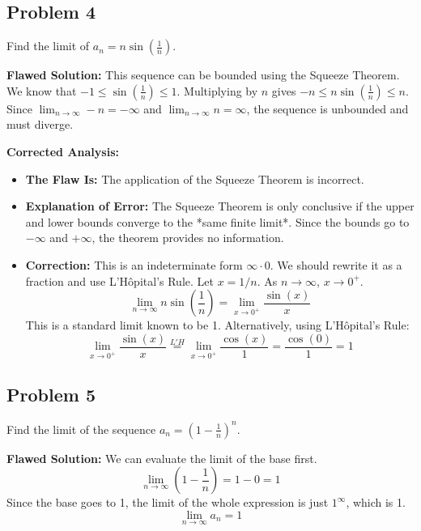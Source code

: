 \documentclass{article}
\begin{document}
\subsection{Problem 4}
Find the limit of $a_n = n \sin(\frac{1}{n})$.

\textbf{Flawed Solution:}
This sequence can be bounded using the Squeeze Theorem. We know that $-1 \le \sin(\frac{1}{n}) \le 1$.
Multiplying by $n$ gives $-n \le n\sin(\frac{1}{n}) \le n$.
Since $\lim_{n \to \infty} -n = -\infty$ and $\lim_{n \to \infty} n = \infty$, the sequence is unbounded and must diverge.

\textbf{Corrected Analysis:}
\begin{itemize}
    \item \textbf{The Flaw Is:} The application of the Squeeze Theorem is incorrect.
    \item \textbf{Explanation of Error:} The Squeeze Theorem is only conclusive if the upper and lower bounds converge to the *same finite limit*. Since the bounds go to $-\infty$ and $+\infty$, the theorem provides no information.
    \item \textbf{Correction:} This is an indeterminate form $ \infty \cdot 0 $. We should rewrite it as a fraction and use L'Hôpital's Rule. Let $x = 1/n$. As $n \to \infty$, $x \to 0^+$.
    \[ \lim_{n \to \infty} n \sin\left(\frac{1}{n}\right) = \lim_{x \to 0^+} \frac{\sin(x)}{x} \]
    This is a standard limit known to be 1. Alternatively, using L'Hôpital's Rule:
    \[ \lim_{x \to 0^+} \frac{\sin(x)}{x} \overset{L'H}{=} \lim_{x \to 0^+} \frac{\cos(x)}{1} = \frac{\cos(0)}{1} = 1 \]
\end{itemize}

\subsection{Problem 5}
Find the limit of the sequence $a_n = \left(1 - \frac{1}{n}\right)^n$.

\textbf{Flawed Solution:}
We can evaluate the limit of the base first.
\[ \lim_{n \to \infty} \left(1 - \frac{1}{n}\right) = 1 - 0 = 1 \]
Since the base goes to 1, the limit of the whole expression is just $1^\infty$, which is 1.
\[ \lim_{n \to \infty} a_n = 1 \]
\end{document}
